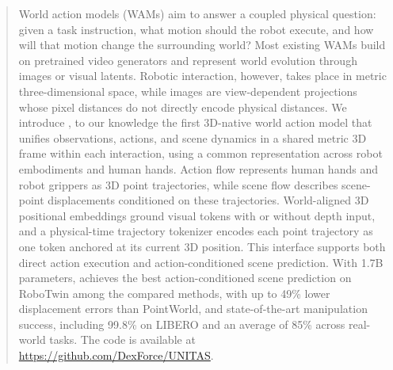 \begin{abstract}
World action models (WAMs) aim to answer a coupled physical question: given a task instruction, what motion should the robot execute, and how will that motion change the surrounding world? Most existing WAMs build on pretrained video generators and represent world evolution through images or visual latents. Robotic interaction, however, takes place in metric three-dimensional space, while images are view-dependent projections whose pixel distances do not directly encode physical distances.
We introduce \method{}, to our knowledge the first 3D-native world action model that unifies observations, actions, and scene dynamics in a shared metric 3D frame within each interaction, using a common representation across robot embodiments and human hands. Action flow represents human hands and robot grippers as 3D point trajectories, while scene flow describes scene-point displacements conditioned on these trajectories. World-aligned 3D positional embeddings ground visual tokens with or without depth input, and a physical-time trajectory tokenizer encodes each point trajectory as one token anchored at its current 3D position. This interface supports both direct action execution and
action-conditioned scene prediction.
With 1.7B parameters, \method{} achieves the best action-conditioned
scene prediction on RoboTwin among the compared methods,
with up to 49\% lower displacement errors than PointWorld,
and state-of-the-art manipulation success, including 99.8\%
on LIBERO and an average of 85\%
across real-world tasks. The code is available at \url{https://github.com/DexForce/UNITAS}.

\end{abstract}
